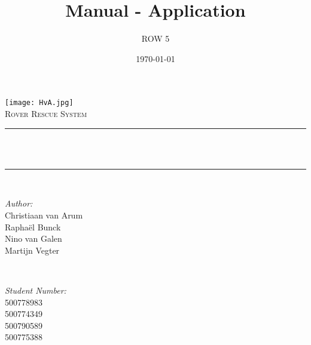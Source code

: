 \title{Manual - Application}
\author{ROW 5}
\date{\today}

\makeatletter
\let\thetitle\@title
\let\theauthor\@author
\let\thedate\@date
\makeatother

\pagestyle{fancy}
\fancyhf{}
\rhead{\theauthor}
\lhead{\thetitle}
\cfoot{\thepage}


	\begin{titlepage}
		\centering
		\vspace*{0.5 cm}
		\texttt{[image: HvA.jpg]}\\[1.0 cm]
		\textsc{\Large Rover Rescue System}\\[0.5 cm]
		\rule{\linewidth}{0.2 mm} \\[0.4 cm]
		{ \huge \bfseries \thetitle}\\
		\rule{\linewidth}{0.2 mm} \\[1.5 cm]
		
		\begin{minipage}{0.4\textwidth}
			\begin{flushleft} \large
				\emph{Author:}\\
				Christiaan van Arum\\
				Rapha\"el Bunck\\
				Nino van Galen\\
				Martijn Vegter
			\end{flushleft}
		\end{minipage}~
		\begin{minipage}{0.4\textwidth}
			\begin{flushright} \large
				\emph{Student Number:} \\
				500778983\\ %
				500774349\\ %
				500790589\\ %
				500775388	%
			\end{flushright}
		\end{minipage}\\[2 cm]
		
		{\large \thedate}\\[2 cm]
		
		\vfill
		
	\end{titlepage}
